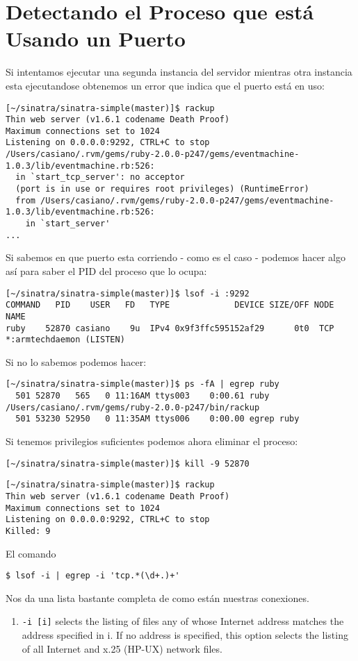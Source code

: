 \section{Detectando el Proceso que está Usando un Puerto}

Si intentamos ejecutar una segunda instancia del servidor mientras otra instancia esta ejecutandose 
obtenemos un error que indica que el puerto está en uso:
\begin{verbatim}
[~/sinatra/sinatra-simple(master)]$ rackup
Thin web server (v1.6.1 codename Death Proof)
Maximum connections set to 1024
Listening on 0.0.0.0:9292, CTRL+C to stop
/Users/casiano/.rvm/gems/ruby-2.0.0-p247/gems/eventmachine-1.0.3/lib/eventmachine.rb:526:
  in `start_tcp_server': no acceptor 
  (port is in use or requires root privileges) (RuntimeError)
  from /Users/casiano/.rvm/gems/ruby-2.0.0-p247/gems/eventmachine-1.0.3/lib/eventmachine.rb:526:
    in `start_server'
...
\end{verbatim}
Si sabemos en que puerto esta corriendo - como es el caso - podemos hacer algo así
para saber el PID del proceso que lo ocupa:
\begin{verbatim}
[~/sinatra/sinatra-simple(master)]$ lsof -i :9292
COMMAND   PID    USER   FD   TYPE             DEVICE SIZE/OFF NODE NAME
ruby    52870 casiano    9u  IPv4 0x9f3ffc595152af29      0t0  TCP *:armtechdaemon (LISTEN)
\end{verbatim}
Si no lo sabemos podemos hacer:
\begin{verbatim}
[~/sinatra/sinatra-simple(master)]$ ps -fA | egrep ruby
  501 52870   565   0 11:16AM ttys003    0:00.61 ruby /Users/casiano/.rvm/gems/ruby-2.0.0-p247/bin/rackup
  501 53230 52950   0 11:35AM ttys006    0:00.00 egrep ruby
\end{verbatim}
Si tenemos privilegios suficientes podemos ahora eliminar el proceso:
\begin{verbatim}
[~/sinatra/sinatra-simple(master)]$ kill -9 52870
\end{verbatim}

\begin{verbatim}
[~/sinatra/sinatra-simple(master)]$ rackup
Thin web server (v1.6.1 codename Death Proof)
Maximum connections set to 1024
Listening on 0.0.0.0:9292, CTRL+C to stop
Killed: 9
\end{verbatim}

El comando 
\begin{verbatim}
$ lsof -i | egrep -i 'tcp.*(\d+.)+'
\end{verbatim}
Nos da una lista bastante completa de como están nuestras conexiones.
\begin{enumerate}
\item 
     \verb|-i [i]|   selects  the  listing  of  files  any of whose Internet address matches the address
                specified in i.  If no address is specified, this option selects the listing of all
                Internet and x.25 (HP-UX) network files.
\end{enumerate}


